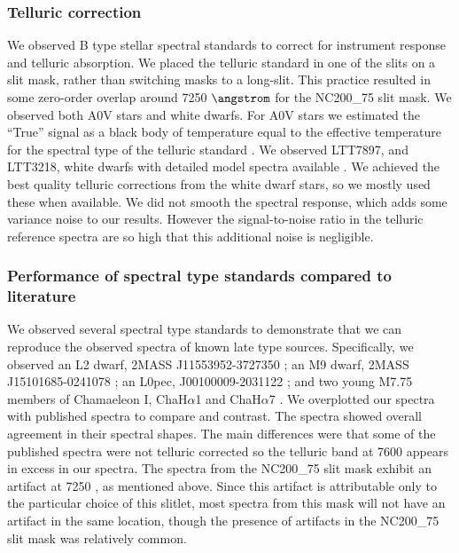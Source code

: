 \subsubsection{Telluric correction}
We observed B type stellar spectral standards to correct for instrument response and telluric absorption.  We placed the telluric standard in one of the slits on a slit mask, rather than switching masks to a long-slit.  This practice resulted in some zero-order overlap around 7250 $\angstrom$ for the NC200\_75 slit mask.  We observed both A0V stars and white dwarfs.  For A0V stars we estimated the ``True'' signal as a black body of temperature equal to the effective temperature for the spectral type of the telluric standard \citep{2000asqu.book.....C}.  We observed LTT7897, and LTT3218, white dwarfs with detailed model spectra available \citep{2014A&A...568A...9M}.  We achieved the best quality telluric corrections from the white dwarf stars, so we mostly used these when available.  We did not smooth the spectral response, which adds some variance noise to our results.  However the signal-to-noise ratio in the telluric reference spectra are so high that this additional noise is negligible.

\subsubsection{Performance of spectral type standards compared to literature}
We observed several spectral type standards to demonstrate that we can reproduce the observed spectra of known late type sources.  Specifically, we observed an L2 dwarf, 2MASS J11553952-3727350 \citep{2008AJ....136.1290R}; an M9 dwarf, 2MASS J15101685-0241078 \citep{2008AJ....136.1290R}; an L0pec, J00100009-2031122 \citep{2007AJ....133..439C}; and two young M7.75 members of Chamaeleon I, ChaH$\alpha$1 and ChaH$\alpha$7 \citep{2004ApJ...602..816L}.  We overplotted our spectra with published spectra to compare and contrast.  The spectra showed overall agreement in their spectral shapes.  The main differences were that some of the published spectra were not telluric corrected so the telluric band at 7600 \angstrom appears in excess in our spectra.  The spectra from the NC200\_75 slit mask exhibit an artifact at 7250 \angstrom, as mentioned above.  Since this artifact is attributable only to the particular choice of this slitlet, most spectra from this mask will not have an artifact in the same location, though the presence of artifacts in the NC200\_75 slit mask was relatively common.

